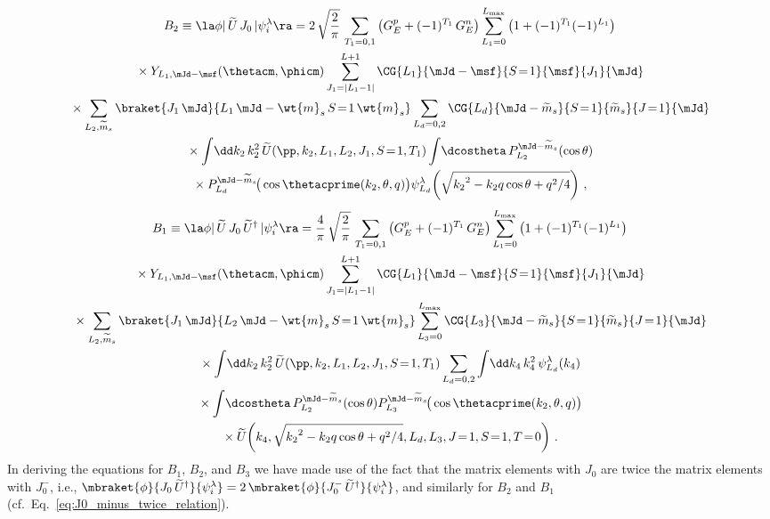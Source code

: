   \begin{multline}
   B_2 \equiv \la \phi | \,\widetilde{U}\, J_0 \, | \psi_i^\lambda \ra
   = 2 \, \sqrt{\frac{2}{\pi}} \,
   \sum_{T_1 = 0,1} \big(G_E ^p + (-1)^{T_1} \, G_E^n\big)
   \sum_{L_1 = 0}^{L_{\rm max}} \big(1 + (-1)^{T_1} (-1)^{L_1}\big) \\
   \null \times Y_{L_1 , \mJd - \msf} (\thetacm, \phicm)
   \sum_{J_1 = |L_1 - 1|}^{L+1}
   \CG{L_1}{\mJd - \msf}{S\!=\!1}{\msf}{J_1}{\mJd} \\
   \null \times
   \sum_{L_2, \widetilde{m}_s}
   \braket{J_1 \, \mJd}{L_1 \, \mJd - \wt{m}_s \, S\!=\!1 \, \wt{m}_s}
   \sum_{L_d = 0, 2}
   \CG{L_d}{\mJd - \widetilde{m}_s}{S\!=\!1}{\widetilde{m}_s}{J\!=\!1}{\mJd} \\
   \null \times
   \int \! \dd k_2 \, k_2^2 \, \widetilde{U}(\pp, k_2, L_1, L_2, J_1, S\!=\!1,
   T_1)  \int \! \dcostheta \,
   P_{L_2}^{\mJd-\widetilde{m}_s}(\cos\theta) \\
   \null \times
   P_{L_d}^{\mJd-\widetilde{m}_s}\!\big(\cos\thetacprime(k_2, \theta, q)\big)
   \psi_{L_d}^\lambda\!\left(\sqrt{{k_2}^2 - k_2 q \cos\theta + q^2/4}\right)
   \,,
  \end{multline}
  \begin{multline}
   B_1 \equiv \la \phi | \,\widetilde{U}\, J_0 \,\widetilde{U}^\dag \, |
   \psi_i^\lambda \ra = \frac{4}{\pi} \, \sqrt{\frac{2}{\pi}} \,
   \sum_{T_1 = 0,1} \big(G_E ^p + (-1)^{T_1} \, G_E^n\big)
   \sum_{L_1 = 0}^{L_{\rm max}} \big(1 + (-1)^{T_1} (-1)^{L_1}\big) \\
   \null \times
   Y_{L_1 , \mJd - \msf} (\thetacm, \phicm)
   \sum_{J_1 = |L_1 - 1|}^{L+1}
   \CG{L_1}{\mJd-\msf}{S\!=\!1}{\msf}{J_1}{\mJd} \\
   \null \times
   \sum_{L_2, \widetilde{m}_s}
   \braket{J_1 \, \mJd}{L_2 \, \mJd - \wt{m}_s \, S\!=\!1 \, \wt{m}_s}
   \sum_{L_3 = 0}^{L_{\rm max}}
   \CG{L_3}{\mJd-\widetilde{m}_s}{S\!=\!1}{\widetilde{m}_s}{J\!=\!1}{\mJd} \\
   \null \times
   \int \! \dd k_2 \, k_2^2 \, \widetilde{U} (\pp, k_2, L_1, L_2, J_1, S\!=\!1,
   T_1)  \sum_{L_d = 0, 2} \int \! \dd k_4 \, k_4^2 \, \psi_{L_d}^\lambda (k_4) \\
   \null \times
   \int \! \dcostheta \, P_{L_2}^{\mJd - \widetilde{m}_s}(\cos\theta)
   P_{L_3}^{\mJd - \widetilde{m}_s}\!\big(\cos \thetacprime(k_2, \theta, q)\big)
   \\ \null \times
   \widetilde{U}\!\left(
     k_4, \sqrt{{k_2}^2 - k_2 q \cos\theta + q^2/4}, L_d, L_3, J\!=\!1, S\!=\!1,
     T\!=\!0   \right) \,.
  \end{multline}
  In deriving the equations for $B_1$, $B_2$, and $B_3$ we have made use of
  the fact that the matrix elements with $J_0$ are twice the matrix elements
  with $J_0^-$, i.e., $\mbraket{\phi}{J_0 \, \widetilde{U}^\dag}{\psi_i^\lambda}
  = 2 \,\mbraket{\phi}{J_0^- \, \widetilde{U}^\dag}{\psi_i^\lambda}$, and
  similarly for $B_2$ and $B_1$ (cf.~Eq.~\ref{eq:J0_minus_twice_relation}).


